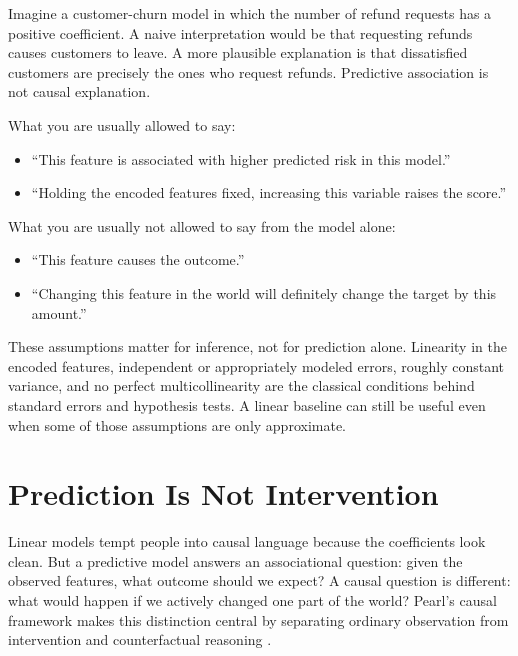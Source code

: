\begin{example}
Imagine a customer-churn model in which the number of refund requests has a positive coefficient. A naive interpretation would be that requesting refunds causes customers to leave. A more plausible explanation is that dissatisfied customers are precisely the ones who request refunds. Predictive association is not causal explanation.
\end{example}

\begin{warningbox}
What you are usually allowed to say:
\begin{itemize}[leftmargin=*]
\item ``This feature is associated with higher predicted risk in this model.''
\item ``Holding the encoded features fixed, increasing this variable raises the score.''
\end{itemize}
What you are usually not allowed to say from the model alone:
\begin{itemize}[leftmargin=*]
\item ``This feature causes the outcome.''
\item ``Changing this feature in the world will definitely change the target by this amount.''
\end{itemize}
\end{warningbox}

\begin{practicalnote}
These assumptions matter for inference, not for prediction alone. Linearity in the encoded features, independent or appropriately modeled errors, roughly constant variance, and no perfect multicollinearity are the classical conditions behind standard errors and hypothesis tests. A linear baseline can still be useful even when some of those assumptions are only approximate.
\end{practicalnote}

\section{Prediction Is Not Intervention}

Linear models tempt people into causal language because the coefficients look clean. But a predictive model answers an associational question: given the observed features, what outcome should we expect? A causal question is different: what would happen if we actively changed one part of the world? Pearl's causal framework makes this distinction central by separating ordinary observation from intervention and counterfactual reasoning \citep{pearl2009}.

